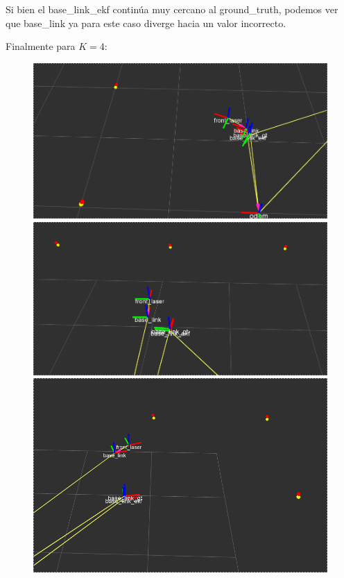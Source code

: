 Si bien el base\_link\_ekf continúa muy cercano al ground\_truth, podemos ver que base\_link ya para este caso diverge hacia un valor incorrecto.

Finalmente para $K=4$:

\begin{figure}[!htb]
  \includegraphics[width=\linewidth]{imagenesEKF/k4/1.png}
\endminipage\hfill
{}
  \includegraphics[width=\linewidth]{imagenesEKF/k4/2.png}
\endminipage\hfill
{}%
  \includegraphics[width=\linewidth]{imagenesEKF/k4/3.png}
\endminipage
\end{figure}

